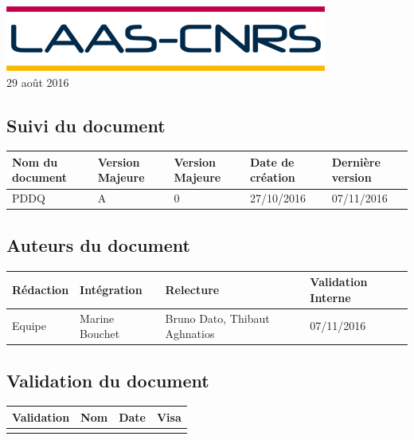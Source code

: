 \documentclass[10pt,a4paper]{article}
\begin{document}
\begin{titlepage}
\includegraphics[scale=0.3]{laas.png} \\[1.1cm] 

\large 29 août 2016
 

\end{titlepage}

\newpage


\subsection*{Suivi du document}

\begin{center}
    \begin{tabular}{| l | l | l | l | l |}
    \hline
     \rowcolor{gray} Nom du document & Version Majeure & Version Majeure & Date de création & Dernière version \\ \hline
    PDDQ & A & 0 & 27/10/2016 & 07/11/2016 \\ \hline
    \end{tabular}
\end{center}


\subsection*{Auteurs du document}

\begin{center}
    \begin{tabular}{| l | l | l | l |}
    \hline
    \rowcolor{gray} Rédaction & Intégration & Relecture & Validation Interne \\ \hline
    Equipe & Marine Bouchet & Bruno Dato, Thibaut Aghnatios & 07/11/2016 \\ \hline
    \end{tabular}
\end{center}

\subsection*{Validation du document}

\begin{center}
    \begin{tabular}{| l | l | l | l |}
    \hline
     \rowcolor{gray} Validation & Nom & Date & Visa \\ \hline
    & & & \\
     \hline
    \end{tabular}
\end{center}
\end{document}
